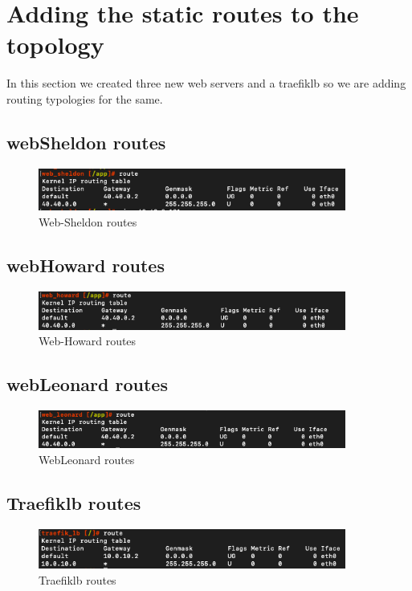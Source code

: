 \section{Adding the static routes to the topology}
In this section we created three new web servers and a traefik\textunderscore lb so we are adding routing typologies for the same.

\subsection{web\textunderscore Sheldon routes}
\begin{figure}[H]
\centering
  \includegraphics[width=0.9\textwidth]{Images/Web-sheldon routes.png}
  \caption{Web-Sheldon routes}
  \label{fig:3.13}
\end{figure}

\subsection{web\textunderscore Howard routes}
\begin{figure}[H]
\centering
  \includegraphics[width=0.9\textwidth]{Images/web-howard routes.png}
  \caption{Web-Howard routes}
  \label{fig:3.14}
\end{figure}

\subsection{web\textunderscore Leonard routes}
\begin{figure}[H]
\centering
  \includegraphics[width=0.9\textwidth]{Images/Web-leonard routes.png}
  \caption{Web\textunderscore Leonard routes}
  \label{fig:3.15}
\end{figure}

\subsection{Traefik\textunderscore lb routes}
\begin{figure}[H]
\centering
  \includegraphics[width=0.9\textwidth]{Images/Traefik-lb route .png}
  \caption{Traefik\textunderscore lb routes}
  \label{fig:3.16}
\end{figure}

